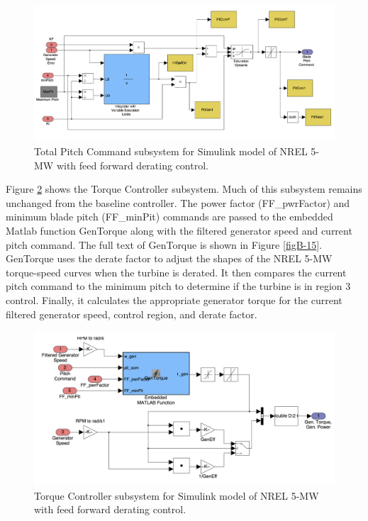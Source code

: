 \begin{figure}[ht]
	\centering
		\includegraphics[width=\linewidth]{Figures/AppendixBFigures/FF_Derate5.png}
	\caption{Total Pitch Command subsystem for Simulink model of NREL 5-MW with feed forward derating control.}
	\label{figB-13}
\end{figure}

Figure \ref{figB-14} shows the Torque Controller subsystem. Much of this subsystem remains unchanged from the baseline controller. The power factor (FF\_pwrFactor) and minimum blade pitch (FF\_minPit) commands are passed to the embedded Matlab function GenTorque along with the filtered generator speed and current pitch command. The full text of GenTorque is shown in Figure \ref{figB-15}. GenTorque uses the derate factor to adjust the shapes of the NREL 5-MW torque-speed curves when the turbine is derated. It then compares the current pitch command to the minimum pitch to determine if the turbine is in region 3 control. Finally, it calculates the appropriate generator torque for the current filtered generator speed, control region, and derate factor.

\begin{figure}[ht]
	\centering
		\includegraphics[width=\linewidth]{Figures/AppendixBFigures/FF_Derate6.png}
	\caption{Torque Controller subsystem for Simulink model of NREL 5-MW with feed forward derating control.}
	\label{figB-14}
\end{figure}

